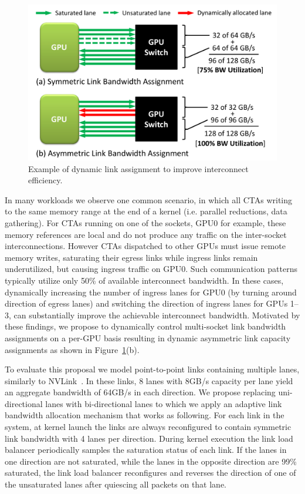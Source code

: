 \begin{figure}[t]
    \centering
    \includegraphics[width=1.0\columnwidth]{figures/link_assignment.pdf}
    \caption{Example of dynamic link assignment to improve interconnect efficiency.}
    \label{fig:symmetric_assymetric}
    \vspace{-.2in}
\end{figure}

In many workloads we observe one common
scenario, in which all CTAs writing to the same memory range at the end of a
kernel (i.e. parallel reductions, data gathering). For CTAs running on one of the
sockets, GPU0 for example, these memory references are local and do not
produce any traffic on the inter-socket interconnections. However CTAs dispatched
to other GPUs must issue remote memory writes, saturating their egress links while
ingress links remain underutilized, but causing ingress traffic on GPU0. 
Such communication patterns typically utilize only
50\% of available interconnect bandwidth. In these cases, dynamically increasing the 
number of ingress lanes for GPU0
(by turning around direction of egress lanes) and switching the direction of
ingress lanes for GPUs 1--3, can substantially improve the achievable interconnect
bandwidth. Motivated by these findings, we propose to dynamically control multi-socket
link bandwidth assignments on a per-GPU basis resulting in
dynamic asymmetric link capacity assignments as shown in
Figure~\ref{fig:symmetric_assymetric}(b).  

To evaluate this proposal we model point-to-point links containing multiple 
lanes, similarly to NVLink~\cite{pascal-tesla-wp}. In these links, 8 
lanes with 8GB/s capacity per lane yield an aggregate bandwidth of 64GB/s in 
each direction. We propose replacing uni-directional lanes with bi-directional 
lanes to which we apply an adaptive link bandwidth allocation mechanism that 
works as following. For each link in the system, at kernel launch the links are 
always reconfigured to contain symmetric link bandwidth with 4 lanes per 
direction. During kernel execution the link load balancer periodically samples 
the saturation status of each link. If the lanes in one direction are not 
saturated, while the lanes in the opposite direction are 99\% saturated, the 
link load balancer reconfigures and reverses the direction of one of the 
unsaturated lanes after quiescing all packets on that lane. 

